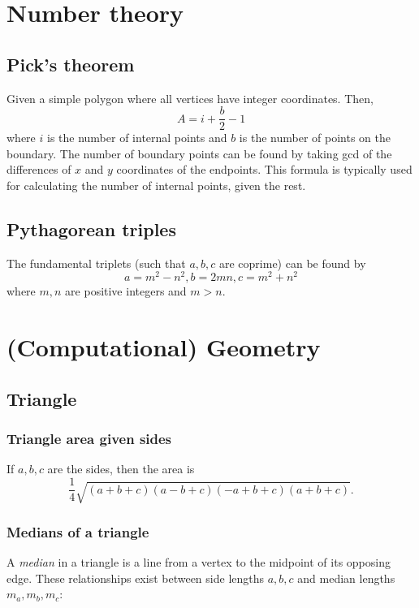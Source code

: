 \documentclass[a4paper,11pt]{article}
\begin{document}
\section{Number theory}

\subsection{Pick's theorem}

Given a simple polygon where all vertices have integer coordinates. Then, $$A=i+\frac{b}{2}-1$$ where $i$ is the number of internal points and $b$ is the number of points on the boundary. The number of boundary points can be found by taking gcd of the differences of $x$ and $y$ coordinates of the endpoints. This formula is typically used for calculating the number of internal points, given the rest.

\subsection{Pythagorean triples}

The fundamental triplets (such that $a,b,c$ are coprime) can be found by $$a=m^2-n^2, b=2mn, c=m^2+n^2$$ where $m,n$ are positive integers and $m>n$.

\section{(Computational) Geometry}

\subsection{Triangle}

\subsubsection{Triangle area given sides}

If $a,b,c$ are the sides, then the area is $$\frac{1}{4}\sqrt{(a+b+c)(a-b+c)(-a+b+c)(a+b+c)}.$$

\subsubsection{Medians of a triangle}

A \emph{median} in a triangle is a line from a vertex to the midpoint of its opposing edge. These relationships exist between side lengths $a,b,c$ and median lengths $m_a,m_b,m_c$:
\end{document}
